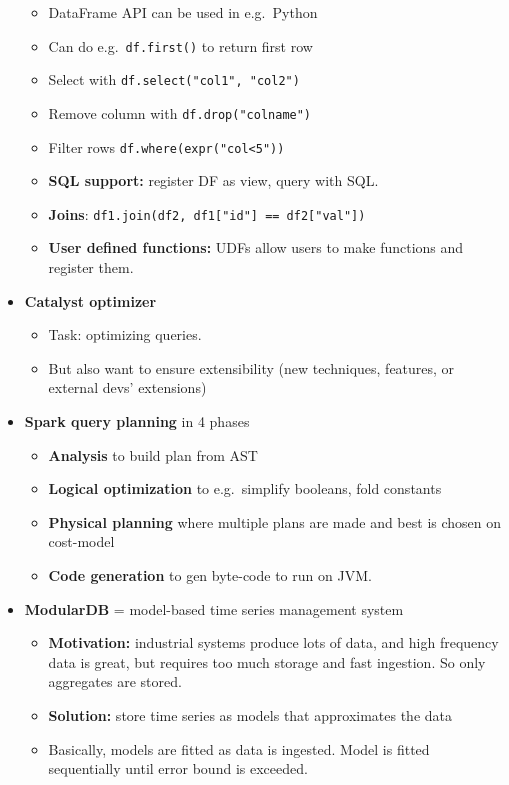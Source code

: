 \begin{multicols}{2}
\begin{itemize}
  \begin{itemize}
    \item
    DataFrame API can be used in e.g.~Python
  \item
    Can do e.g.~\texttt{df.first()} to return first row
  \item
    Select with \texttt{df.select("col1",\ "col2")}
  \item
    Remove column with \texttt{df.drop("colname")}
  \item
    Filter rows \texttt{df.where(expr("col\textless{}5"))}
  \item
    \textbf{SQL support:} register DF as view, query with SQL.
  \item
    \textbf{Joins}:
    \texttt{df1.join(df2,\ df1{[}"id"{]}\ ==\ df2{[}"val"{]})}
  \item
    \textbf{User defined functions:} UDFs allow users to make functions
    and register them.
  \end{itemize}
\item
  \textbf{Catalyst optimizer}

  \begin{itemize}
    \item
    Task: optimizing queries.
  \item
    But also want to ensure extensibility (new techniques, features, or
    external devs' extensions)
  \end{itemize}
\item
  \textbf{Spark query planning} in 4 phases

  \begin{itemize}
    \item
    \textbf{Analysis} to build plan from AST
  \item
    \textbf{Logical optimization} to e.g.~simplify booleans, fold
    constants
  \item
    \textbf{Physical planning} where multiple plans are made and best is
    chosen on cost-model
  \item
    \textbf{Code generation} to gen byte-code to run on JVM.
  \end{itemize}
\item
  \textbf{ModularDB} = model-based time series management system

  \begin{itemize}
    \item
    \textbf{Motivation:} industrial systems produce lots of data, and
    high frequency data is great, but requires too much storage and fast
    ingestion. So only aggregates are stored.
  \item
    \textbf{Solution:} store time series as models that approximates the
    data
  \item
    Basically, models are fitted as data is ingested. Model is fitted
    sequentially until error bound is exceeded.


\end{itemize}
\end{itemize}
\end{multicols}
